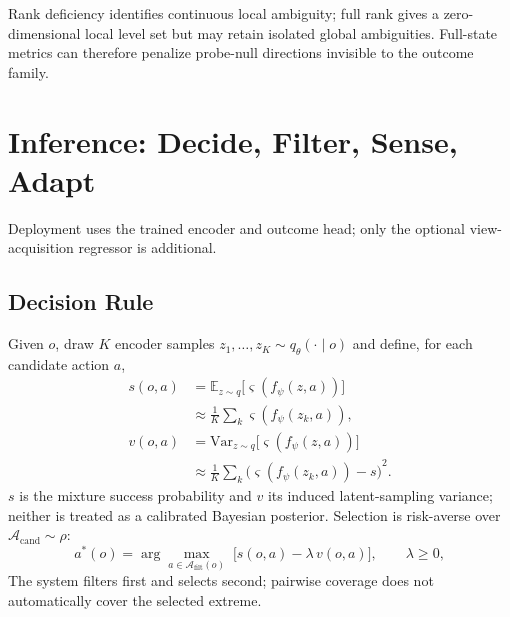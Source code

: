 \documentclass[letterpaper, 10pt, conference]{ieeeconf}
\newcommand{\E}{\mathbb{E}}
\newcommand{\Afilt}{\mathcal{A}_{\mathrm{filt}}}
\begin{document}
Rank deficiency identifies continuous local ambiguity; full rank gives a
zero-dimensional local level set but may retain isolated global ambiguities.
Full-state metrics can therefore penalize probe-null directions invisible to
the outcome family.

\section{Inference: Decide, Filter, Sense, Adapt}
\label{sec:inference}

Deployment uses the trained encoder and outcome head; only the optional
view-acquisition regressor is additional.

\subsection{Decision Rule}
\label{sec:decision}
Given $o$, draw $K$ encoder samples $z_1,\dots,z_K\sim q_\theta(\cdot\mid o)$
and define, for each candidate action $a$,
\begin{align}
s(o,a)&=\E_{z\sim q}\bigl[\varsigma(f_\psi(z,a))\bigr]\nonumber\\
&\approx\frac1K\sum_{k}\varsigma(f_\psi(z_k,a)),
\label{eq:smean}\\
v(o,a)&=\mathrm{Var}_{z\sim q}\bigl[\varsigma(f_\psi(z,a))\bigr]\nonumber\\
&\approx\frac1K\sum_{k}{\bigl(\varsigma(f_\psi(z_k,a))-s\bigr)}^2.
\label{eq:svar}
\end{align}
$s$ is the mixture success probability and $v$ its induced latent-sampling
variance; neither is treated as a calibrated Bayesian posterior. Selection
is risk-averse over $\mathcal{A}_{\mathrm{cand}}\sim\rho$:
\begin{equation}
a^\ast(o)=\arg\max_{a\in\Afilt(o)}\;
\bigl[s(o,a)-\lambda\,v(o,a)\bigr],\qquad\lambda\ge0,
\label{eq:selection}
\end{equation}
The system filters first and selects second; pairwise coverage does not
automatically cover the selected extreme.
\end{document}
